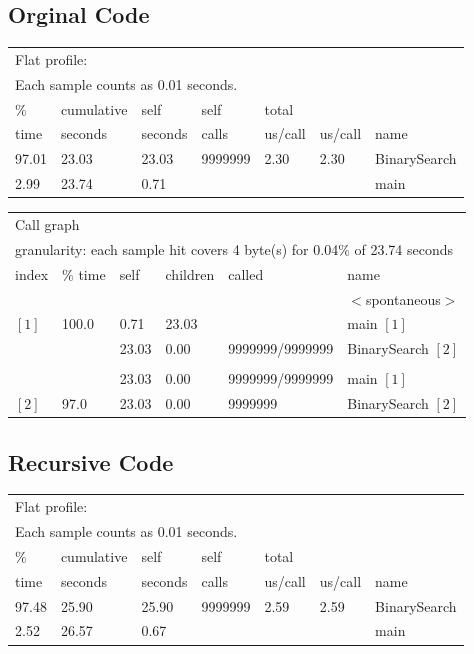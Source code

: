 \documentclass[11pt]{article}
\begin{document}
\begin{enumerate}
\subsection*{Orginal Code}
\begin{table}[H]
\begin{tabular}{ l  l  l  l  l  l  l }
\multicolumn{7}{l}{Flat profile:}\\
\multicolumn{7}{l}{Each sample counts as 0.01 seconds.} \\
 $\%$  & cumulative &  self        &      self   &  total     &      &    \\
 time   & seconds     & seconds  &   calls    & us/call  & us/call & name    \\
 97.01  &   23.03  &  23.03 & 9999999   &  2.30    & 2.30 & BinarySearch\\
  2.99    & 23.74    & 0.71    &      &     &          &   main
\end{tabular}
\end{table}
\begin{table}[H]
\begin{tabular}{  l  l  l  l  l  l  }
\multicolumn{6}{l}{Call graph}\\
\multicolumn{6}{l}{granularity: each sample hit covers 4 byte(s) for 0.04$\%$ of 23.74 seconds}\\
index  & $\%$ time &   self & children  &  called  &   name \\
     & & & & &                                            $<$spontaneous$>$\\
$[1]$   & 100.0 &  0.71  & 23.03         &  &          main $ [1] $ \\
        & &       23.03   & 0.00& 9999999/9999999   &  BinarySearch $[2]$ \\
\hline\\
         & &      23.03    &0.00 & 9999999/9999999    & main $[1]$\\
$[2]$  &   97.0   &23.03   & 0.00 & 9999999                 &    BinarySearch $[2]$\\
\hline 
\end{tabular}
\end{table}

\subsection*{Recursive Code}
\begin{table}[H]
\begin{tabular}{l l l l l l l}
\multicolumn{7}{l}{Flat profile:}\\
\multicolumn{7}{l}{Each sample counts as 0.01 seconds.}\\
 $\%$  & cumulative &  self        &      self   &  total     &      &    \\
 time   & seconds     & seconds  &   calls    & us/call  & us/call & name    \\  
 97.48   &  25.90  &  25.90 &9999999   &  2.59   &  2.59  &BinarySearch\\
   2.52    &  26.57    &   0.67       &&&&                                       main
\end{tabular}
 \end{table}
 

\end{enumerate}
\end{document}

